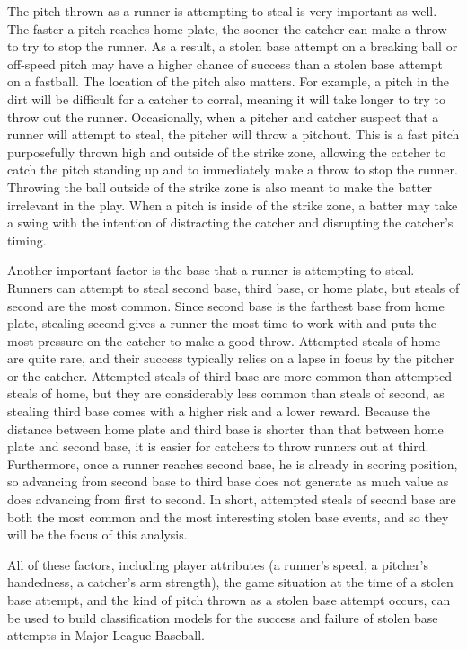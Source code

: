 \documentclass{article}
\begin{document}
The pitch thrown as a runner is attempting to steal is very important as well. The faster a pitch reaches home plate, the sooner the catcher can make a throw to try to stop the runner. As a result, a stolen base attempt on a breaking ball or off-speed pitch may have a higher chance of success than a stolen base attempt on a fastball. The location of the pitch also matters. For example, a pitch in the dirt will be difficult for a catcher to corral, meaning it will take longer to try to throw out the runner. Occasionally, when a pitcher and catcher suspect that a runner will attempt to steal, the pitcher will throw a pitchout. This is a fast pitch purposefully thrown high and outside of the strike zone, allowing the catcher to catch the pitch standing up and to immediately make a throw to stop the runner. Throwing the ball outside of the strike zone is also meant to make the batter irrelevant in the play. When a pitch is inside of the strike zone, a batter may take a swing with the intention of distracting the catcher and disrupting the catcher’s timing.

Another important factor is the base that a runner is attempting to steal. Runners can attempt to steal second base, third base, or home plate, but steals of second are the most common. Since second base is the farthest base from home plate, stealing second gives a runner the most time to work with and puts the most pressure on the catcher to make a good throw. Attempted steals of home are quite rare, and their success typically relies on a lapse in focus by the pitcher or the catcher. Attempted steals of third base are more common than attempted steals of home, but they are considerably less common than steals of second, as stealing third base comes with a higher risk and a lower reward. Because the distance between home plate and third base is shorter than that between home plate and second base, it is easier for catchers to throw runners out at third. Furthermore, once a runner reaches second base, he is already in scoring position, so advancing from second base to third base does not generate as much value as does advancing from first to second. In short, attempted steals of second base are both the most common and the most interesting stolen base events, and so they will be the focus of this analysis.

All of these factors, including player attributes (a runner’s speed, a pitcher’s handedness, a catcher’s arm strength), the game situation at the time of a stolen base attempt, and the kind of pitch thrown as a stolen base attempt occurs, can be used to build classification models for the success and failure of stolen base attempts in Major League Baseball.
\end{document}

